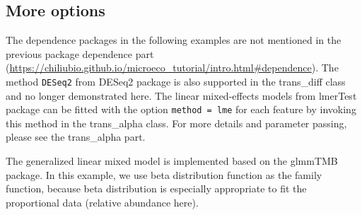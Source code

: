 \documentclass[
]{book}
\newenvironment{Shaded}{\begin{snugshade}}{\end{snugshade}}
\newcommand{\AttributeTok}[1]{\textcolor[rgb]{0.77,0.63,0.00}{#1}}
\newcommand{\CommentTok}[1]{\textcolor[rgb]{0.56,0.35,0.01}{\textit{#1}}}
\newcommand{\ControlFlowTok}[1]{\textcolor[rgb]{0.13,0.29,0.53}{\textbf{#1}}}
\newcommand{\FloatTok}[1]{\textcolor[rgb]{0.00,0.00,0.81}{#1}}
\newcommand{\FunctionTok}[1]{\textcolor[rgb]{0.00,0.00,0.00}{#1}}
\newcommand{\NormalTok}[1]{#1}
\newcommand{\OtherTok}[1]{\textcolor[rgb]{0.56,0.35,0.01}{#1}}
\newcommand{\SpecialCharTok}[1]{\textcolor[rgb]{0.00,0.00,0.00}{#1}}
\newcommand{\StringTok}[1]{\textcolor[rgb]{0.31,0.60,0.02}{#1}}
\begin{document}
\hypertarget{more-options}{%
\subsection{More options}\label{more-options}}

The dependence packages in the following examples are not mentioned in the previous package dependence part (\url{https://chiliubio.github.io/microeco_tutorial/intro.html\#dependence}).
The method \texttt{DESeq2} from DESeq2 package is also supported in the trans\_diff class and no longer demonstrated here.
The linear mixed-effects models from lmerTest package can be fitted with the option \texttt{method\ =\ \textquotesingle{}lme\textquotesingle{}} for each feature by
invoking this method in the trans\_alpha class.
For more details and parameter passing, please see the trans\_alpha part.

\begin{Shaded}
\end{Shaded}

The generalized linear mixed model is implemented based on the glmmTMB package.
In this example, we use beta distribution function as the family function,
because beta distribution is especially appropriate to fit the proportional data (relative abundance here).
\end{document}
